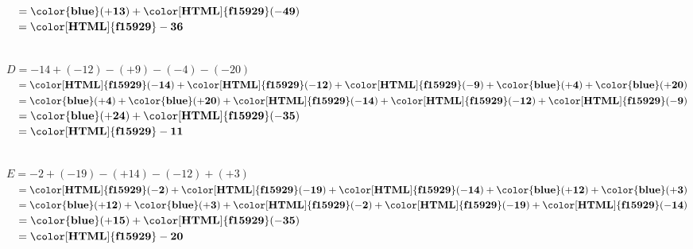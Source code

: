 \begin{corrige}
\begin{multicols}
\begin{list}{}
            $ \phantom{A}= \mathbf{{\color{blue}(+13)}}+\mathbf{{\color[HTML]{f15929}(-49)}} $\\
            $ \phantom{A}= \mathbf{{\color[HTML]{f15929}-36}} $\\
            \columnbreak
            \item \phantom{rrr}\\
            $ D =  -14+(-12)-(+9)-(-4)-(-20)$\\
            $ \phantom{A}= \mathbf{{\color[HTML]{f15929}(-14)}}+\mathbf{{\color[HTML]{f15929}(-12)}}+\mathbf{{\color[HTML]{f15929}(-9)}}+\mathbf{{\color{blue}(+4)}}+\mathbf{{\color{blue}(+20)}} $\\
            $ \phantom{A}= \mathbf{{\color{blue}(+4)}}+\mathbf{{\color{blue}(+20)}}+\mathbf{{\color[HTML]{f15929}(-14)}}+\mathbf{{\color[HTML]{f15929}(-12)}}+\mathbf{{\color[HTML]{f15929}(-9)}} $\\
            $ \phantom{A}= \mathbf{{\color{blue}(+24)}}+\mathbf{{\color[HTML]{f15929}(-35)}} $\\
            $ \phantom{A}= \mathbf{{\color[HTML]{f15929}-11}} $\\
            \item \phantom{rrr}\\
            $ E =  -2+(-19)-(+14)-(-12)+(+3)$\\
            $ \phantom{A}= \mathbf{{\color[HTML]{f15929}(-2)}}+\mathbf{{\color[HTML]{f15929}(-19)}}+\mathbf{{\color[HTML]{f15929}(-14)}}+\mathbf{{\color{blue}(+12)}}+\mathbf{{\color{blue}(+3)}} $\\
            $ \phantom{A}= \mathbf{{\color{blue}(+12)}}+\mathbf{{\color{blue}(+3)}}+\mathbf{{\color[HTML]{f15929}(-2)}}+\mathbf{{\color[HTML]{f15929}(-19)}}+\mathbf{{\color[HTML]{f15929}(-14)}} $\\
            $ \phantom{A}= \mathbf{{\color{blue}(+15)}}+\mathbf{{\color[HTML]{f15929}(-35)}} $\\
            $ \phantom{A}= \mathbf{{\color[HTML]{f15929}-20}} $
        \end{list}
    \end{multicols}
\end{corrige}